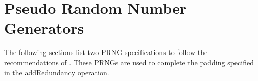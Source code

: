 \section{Pseudo Random Number Generators \label{sec:prng}}
The following sections list two PRNG specifications to follow the recommendations of \cite{RFC1750}. These PRNGs are used to complete the padding specified in the addRedundancy operation.

